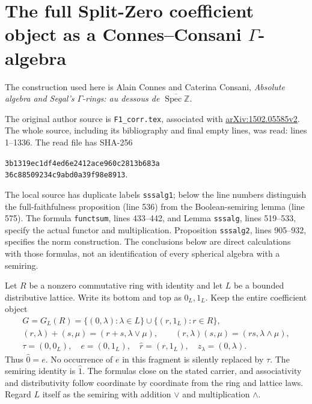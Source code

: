\section{The full Split-Zero coefficient object as a Connes--Consani
\texorpdfstring{$\Gamma$}{Gamma}-algebra}

The construction used here is Alain Connes and Caterina Consani,
\emph{Absolute algebra and Segal's $\Gamma$-rings: au dessous de
$\overline{\operatorname{Spec}\mathbb Z}$}.

The original author source is
\texttt{F1\_corr.tex}, associated with
\href{https://arxiv.org/abs/1502.05585v2}{arXiv:1502.05585v2}.
The whole source, including its bibliography and final empty lines,
was read: lines 1--1336.  The read file has SHA-256
\begin{center}\small\texttt{3b1319ec1df4ed6e2412ace960c2813b683a}\\
\texttt{36c88509234c9abd0a39f98e8913}.\end{center}
The local source has duplicate labels \texttt{sssalg1}; below the
line numbers distinguish the full-faithfulness proposition (line 536)
from the Boolean-semiring lemma (line 575).  The formula
\texttt{functsum}, lines 433--442, and Lemma \texttt{sssalg},
lines 519--533, specify the actual functor and multiplication.
Proposition \texttt{sssalg2}, lines 905--932, specifies the norm
construction.  The conclusions below are direct calculations with
those formulas, not an identification of every spherical algebra with
a semiring.

Let $R$ be a nonzero commutative ring with identity and let $L$ be a
bounded distributive lattice.  Write its bottom and top as $0_L,1_L$.
Keep the entire coefficient object
\begin{equation}\tag{HG1}
 \begin{gathered}
 G=G_L(R)=\{(0,\lambda):\lambda\in L\}
       \cup\{(r,1_L):r\in R\},\\
 (r,\lambda)+(s,\mu)=(r+s,\lambda\vee\mu),\qquad
 (r,\lambda)(s,\mu)=(rs,\lambda\wedge\mu),\\
 \tau=(0,0_L),\quad e=(0,1_L),\quad
 \widehat r=(r,1_L),\quad z_\lambda=(0,\lambda).
 \end{gathered}
\end{equation}
Thus $\widehat0=e$.  No occurrence of $e$ in this fragment is
silently replaced by $\tau$.  The semiring identity is $\widehat1$.
The formulas close on the stated carrier, and associativity and
distributivity follow coordinate by coordinate from the ring and
lattice laws.  Regard $L$ itself as the semiring with addition $\vee$
and multiplication $\wedge$.

